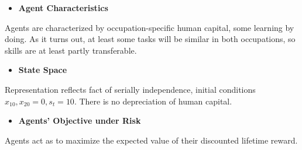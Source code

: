 \begin{itemize}\item[] \textbf{Agent Characteristics}\end{itemize}
Agents are characterized by occupation-specific human capital, some learning by doing. As it turns out, at least some tasks will be similar in both occupations, so skills are at least partly transferable.
\begin{itemize}\item[] \textbf{State Space}\end{itemize}
Representation reflects fact of serially independence, initial conditions $x_{10}, x_{20} = 0, s_t = 10$. There is no depreciation of human capital.
\begin{itemize}\item[] \textbf{Agents' Objective under Risk}\end{itemize}
Agents act as to maximize the expected value of their discounted lifetime reward.
